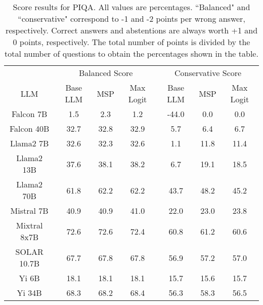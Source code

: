 \begin{table*}
\centering
\begin{tabular}{c|c|c|c|c|c|c}
& \multicolumn{3}{c|}{Balanced Score} & \multicolumn{3}{c}{Conservative Score} \\ 
LLM & Base LLM & MSP & Max Logit & Base LLM & MSP & Max Logit\\ \hline
Falcon 7B & 1.5 & 2.3 & 1.2 & -44.0 & 0.0 & 0.0\\
Falcon 40B & 32.7 & 32.8 & 32.9 & 5.7 & 6.4 & 6.7\\
Llama2 7B & 32.6 & 32.3 & 32.6 & 1.1 & 11.8 & 11.4\\
Llama2 13B & 37.6 & 38.1 & 38.2 & 6.7 & 19.1 & 18.5\\
Llama2 70B & 61.8 & 62.2 & 62.2 & 43.7 & 48.2 & 45.2\\
Mistral 7B & 40.9 & 40.9 & 41.0 & 22.0 & 23.0 & 23.8\\
Mixtral 8x7B & 72.6 & 72.6 & 72.4 & 60.8 & 61.2 & 60.6\\
SOLAR 10.7B & 67.7 & 67.8 & 67.8 & 56.9 & 57.2 & 57.0\\
Yi 6B & 18.1 & 18.1 & 18.1 & 15.7 & 15.6 & 15.7\\
Yi 34B & 68.3 & 68.2 & 68.4 & 56.3 & 58.3 & 56.5\\
\hline
\end{tabular}
\caption{Score results for PIQA. All values are percentages. ``Balanced" and ``conservative" correspond to -1 and -2 points per wrong answer, respectively. Correct answers and abstentions are always worth +1 and 0 points, respectively. The total number of points is divided by the total number of questions to obtain the percentages shown in the table.}
\label{tab:piqa_score}
\end{table*}
